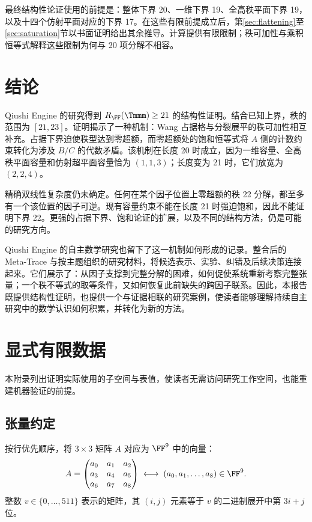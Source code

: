 \documentclass[11pt,a4paper]{article}
\begin{document}
最终结构性论证使用的前提是：整体下界 20、一维下界 19、全高秩平面下界 19，以及十四个仿射平面对应的下界 17。在这些有限前提成立后，第\ref{sec:flattening}至\ref{sec:saturation}节以书面证明给出其余推导。计算提供有限限制；秩可加性与乘积恒等式解释这些限制为何与 20 项分解不相容。

\section{结论}

Qiushi Engine 的研究得到 $R_{\FF}(\Tmmm)\ge21$ 的结构性证明。结合已知上界，秩的范围为 $[21,23]$。证明揭示了一种机制：Wang 占据格与分裂展平的秩可加性相互补充。占据下界迫使秩型达到零超额，而零超额处的饱和恒等式将 $A$ 侧的计数约束转化为涉及 $B/C$ 的代数矛盾。该机制在长度 20 时成立，因为一维容量、全高秩平面容量和仿射超平面容量恰为 $(1,1,3)$；长度变为 21 时，它们放宽为 $(2,2,4)$。

精确双线性复杂度仍未确定。任何在某个因子位置上零超额的秩 22 分解，都至多有一个该位置的因子可逆。现有容量约束不能在长度 21 时强迫饱和，因此不能证明下界 22。更强的占据下界、饱和论证的扩展，以及不同的结构方法，仍是可能的研究方向。

Qiushi Engine 的自主数学研究也留下了这一机制如何形成的记录。整合后的 Meta-Trace 与按主题组织的研究材料，将候选表示、实验、纠错及后续决策连接起来。它们展示了：从因子支撑到完整分解的困难，如何促使系统重新考察完整张量；一个秩不等式的取等条件，又如何恢复此前缺失的跨因子联系。因此，本报告既提供结构性证明，也提供一个与证据相联的研究案例，使读者能够理解持续自主研究中的数学认识如何积累，并转化为新的方法。

\bigskip
\appendix
\section{显式有限数据}\label{app:data}

本附录列出证明实际使用的子空间与表值，使读者无需访问研究工作空间，也能重建机器验证的前提。

\subsection{张量约定}

按行优先顺序，将 $3\times3$ 矩阵 $A$ 对应为 $\FF^9$ 中的向量：
\[
  A=\begin{pmatrix}a_0&a_1&a_2\\a_3&a_4&a_5\\a_6&a_7&a_8\end{pmatrix}
  \;\longleftrightarrow\;(a_0,a_1,\ldots,a_8)\in\FF^9.
\]
整数 $v\in\{0,\ldots,511\}$ 表示的矩阵，其 $(i,j)$ 元素等于 $v$ 的二进制展开中第 $3i+j$ 位。
\end{document}
